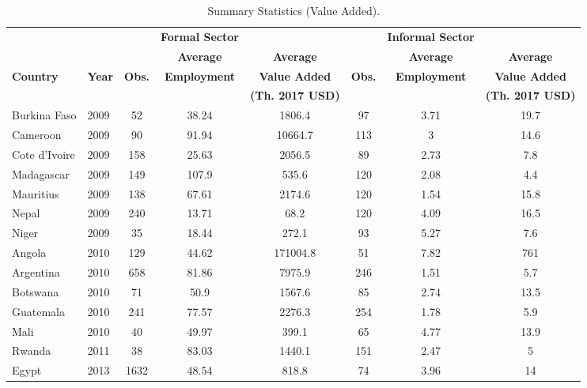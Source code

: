 \documentclass[letterpaper, 12pt]{article}
\begin{document}
\begin{table}[ht!]
    \caption{Summary Statistics (Value Added).}
    \label{tab_va}
\scriptsize
    \centering
    \begin{tabular}{ll|ccc|ccc}
     &  & & \textbf{Formal Sector} & & & \textbf{Informal Sector} & \\
     & &  & \textbf{Average} & \textbf{Average} &  & \textbf{Average} & \textbf{Average} \\
     \textbf{Country}& \textbf{Year} & \textbf{Obs.} & \textbf{Employment} & \textbf{Value Added} & \textbf{Obs.} & \textbf{Employment} & \textbf{Value Added} \\
        & & &  & \textbf{(Th. 2017 USD)} &  &  & \textbf{(Th. 2017 USD)} \\
\hline
\hline
Burkina Faso & 2009 & 52 & 38.24 & 1806.4 & 97 & 3.71 & 19.7 \\
Cameroon & 2009 & 90 & 91.94 & 10664.7 & 113 & 3 & 14.6 \\
Cote d'Ivoire & 2009 & 158 & 25.63 & 2056.5 & 89 & 2.73 & 7.8 \\
Madagascar & 2009 & 149 & 107.9 & 535.6 & 120 & 2.08 & 4.4 \\
Mauritius & 2009 & 138 & 67.61 & 2174.6 & 120 & 1.54 & 15.8 \\
Nepal & 2009 & 240 & 13.71 & 68.2 & 120 & 4.09 & 16.5 \\
Niger & 2009 & 35 & 18.44 & 272.1 & 93 & 5.27 & 7.6 \\
Angola & 2010 & 129 & 44.62 & 171004.8 & 51 & 7.82 & 761 \\
Argentina & 2010 & 658 & 81.86 & 7975.9 & 246 & 1.51 & 5.7 \\
Botswana & 2010 & 71 & 50.9 & 1567.6 & 85 & 2.74 & 13.5 \\
Guatemala & 2010 & 241 & 77.57 & 2276.3 & 254 & 1.78 & 5.9 \\
Mali & 2010 & 40 & 49.97 & 399.1 & 65 & 4.77 & 13.9 \\
Rwanda & 2011 & 38 & 83.03 & 1440.1 & 151 & 2.47 & 5 \\
Egypt & 2013 & 1632 & 48.54 & 818.8 & 74 & 3.96 & 14 \\

\end{tabular}
\end{table}
\end{document}
